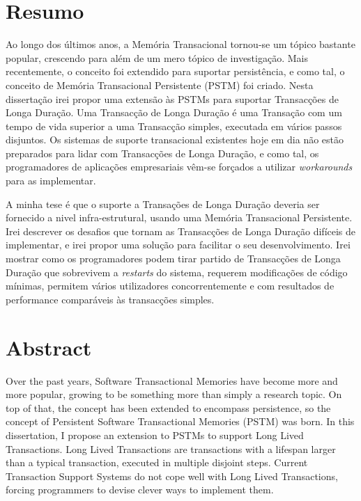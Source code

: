 \cleardoublepage



\chapter*{Resumo}
\thispagestyle{empty}

Ao longo dos últimos anos, a Memória Transacional tornou-se um tópico
bastante popular, crescendo para além de um mero tópico de
investigação.  Mais recentemente, o conceito foi extendido para
suportar persistência, e como tal, o conceito de Memória Transacional
Persistente (PSTM) foi criado. Nesta dissertação irei propor uma
extensão às PSTMs para suportar Transacções de Longa Duração. Uma
Transacção de Longa Duração é uma Transação com um tempo de vida
superior a uma Transacção simples, executada em vários passos
disjuntos. Os sistemas de suporte transacional existentes hoje em dia
não estão preparados para lidar com Transacções de Longa Duração, e
como tal, os programadores de aplicações empresariais vêm-se forçados
a utilizar {\it workarounds} para as implementar.

A minha tese é que o suporte a Transações de Longa Duração deveria ser
fornecido a nivel infra-estrutural, usando uma Memória Transacional
Persistente. Irei descrever os desafios que tornam as Transacções de
Longa Duração difíceis de implementar, e irei propor uma solução para
facilitar o seu desenvolvimento. Irei mostrar como os programadores
podem tirar partido de Transacções de Longa Duração que sobrevivem a
{\it restarts} do sistema, requerem modificações de código mínimas,
permitem vários utilizadores concorrentemente e com resultados de
performance comparáveis às transacções simples.

\newpage
\thispagestyle{empty}

\chapter*{Abstract}
\thispagestyle{empty}

Over the past years, Software Transactional Memories have become more
and more popular, growing to be something more than simply a research
topic. On top of that, the concept has been extended to encompass
persistence, so the concept of Persistent Software Transactional
Memories (PSTM) was born. In this dissertation, I propose an extension
to PSTMs to support Long Lived Transactions. Long Lived Transactions
are transactions with a lifespan larger than a typical transaction,
executed in multiple disjoint steps. Current Transaction Support
Systems do not cope well with Long Lived Transactions, forcing
programmers to devise clever ways to implement them.

